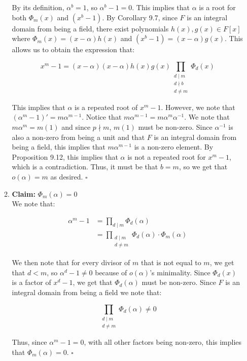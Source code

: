 \documentclass{article}
\begin{document}
\begin{enumerate}
\begin{enumerate}
    By its definition, $\alpha^b = 1$, so $\alpha^b - 1 = 0$. This implies that $\alpha$ is a root for both $\Phi_m(x)$ and $(x^b - 1)$. By Corollary 9.7, since $F$ is an integral domain from being a field, there exist polynomials $h(x), g(x) \in F[x]$ where $\Phi_m(x) = (x - \alpha)h(x)$ and $(x^b - 1) = (x - \alpha)g(x)$. This allows us to obtain the expression that:
    
    $$x^m - 1  = (x - \alpha)(x - \alpha)h(x)g(x)\prod_{\substack{d \mid m \\ d \nmid b \\ d \neq m}} \Phi_d(x) $$

    This implies that $\alpha$ is a repeated root of $x^m - 1$. However, we note that $(\alpha^m - 1)' = m\alpha^{m-1}$. Notice that $m\alpha^{m-1} = m\alpha^{m}\alpha^{-1}$. We note that $m\alpha^m = m(1)$ and since $p \nmid m$, $m(1)$ must be non-zero. Since $\alpha^{-1}$ is also a non-zero from being a unit and that $F$ is an integral domain from being a field, this implies that $m\alpha^{m-1}$ is a non-zero element. By Proposition 9.12, this implies that $\alpha$ is not a repeated root for $x^m - 1$, which is a contradiction. Thus, it must be that $b = m$, so we get that $o(\alpha) = m$ as desired.  \hfill $\square$ \\
 
    \item 
    \textbf{Claim:} $\Phi_m(\alpha) = 0$\\

    We note that: 

    \begin{align*}
        \alpha^m - 1 &= \prod_{d \mid m} \Phi_d(\alpha) \\
        &= \prod_{\substack{d \mid m \\ d \neq m}} \Phi_d(\alpha) \cdot \Phi_m(\alpha)
    \end{align*}

    We then note that for every divisor of $m$ that is not equal to $m$, we get that $d < m$, so $\alpha^d - 1 \neq 0$ because of $o(\alpha)$'s minimality. Since $\Phi_d(x)$ is a factor of $x^d - 1$, we get that $\Phi_d(\alpha)$ must be non-zero. Since $F$ is an integral domain from being a field we note that: 
    
    $$\prod_{\substack{d \mid m \\ d \neq m}} \Phi_d(\alpha) \neq 0$$

    Thus, since $\alpha^m - 1 = 0$, with all other factors being non-zero, this implies that $\Phi_m(\alpha) = 0$. \hfill $\square$ \\ 


\end{enumerate}
\end{enumerate}
\end{document}
